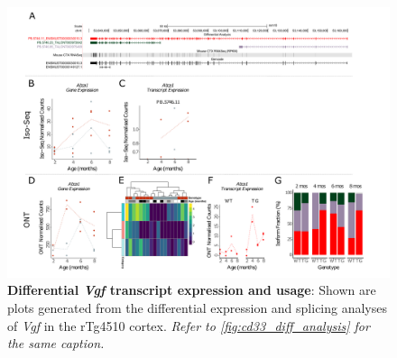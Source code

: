 \begin{landscape}
	\begin{figure}[htp]
		\begin{center}
			\includegraphics[page=20,trim={0 0.5cm 0 1.5cm},scale =0.85]{Figures/TargetGene_DifferentialAnalysis.pdf}
		\end{center}
		\captionsetup{width=1.5\textwidth}
		\caption[Differential \textit{Vgf} transcript expression and usage]%
		{\textbf{Differential \textit{Vgf} transcript expression and usage}: Shown are plots generated from the differential expression and splicing analyses of \textit{Vgf} in the rTg4510 cortex. \textit{Refer to \cref{fig:cd33_diff_analysis} for the same caption.}}   
		\label{fig:Vgf_diff_analysis}
	\end{figure}
\end{landscape}